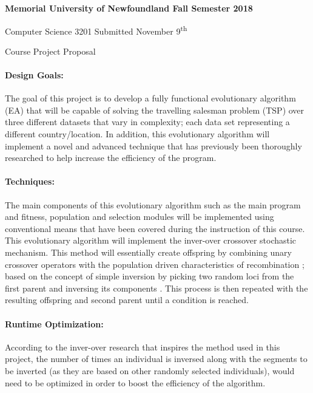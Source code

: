 	{
		\parindent=0pt
		\bfseries
		Memorial University of Newfoundland \hfill Fall Semester 2018 
		
		Computer Science 3201 \hfill Submitted November 9\textsuperscript{th}
		
		\vskip 2pc
		
		{
			\Large \hfill Course Project Proposal \hfill
		}
	}
	
	\paragraph{Design Goals:} The goal of this project is to develop a fully functional evolutionary algorithm (EA) that will be capable of solving the travelling salesman problem (TSP) over three different datasets that vary in complexity; each data set representing a different country/location. In addition, this evolutionary algorithm will implement a novel and advanced technique that has previously been thoroughly researched to help increase the efficiency of the program.
	
	\paragraph{Techniques:} The main components of this evolutionary algorithm such as the main program and fitness, population and selection modules will be implemented using conventional means that have been covered during the instruction of this course. This evolutionary algorithm will implement the inver-over crossover stochastic mechanism. This method will essentially create offspring by combining unary crossover operators with the population driven characteristics of recombination \cite{art3}; based on the concept of simple inversion by picking two random loci from the first parent and inversing its components \cite{art7}. This process is then repeated with the resulting offspring and second parent until a condition is reached.
	
	\paragraph{Runtime Optimization:} According to the inver-over research that inspires the method used in this project, the number of times an individual is inversed along with the segments to be inverted (as they are based on other randomly selected individuals), would need to be optimized in order to boost the efficiency of the algorithm. 
	
